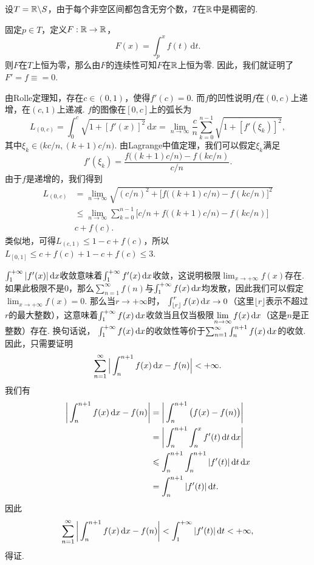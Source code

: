 \begin{ans}
  设$T=\mathbb R\backslash S$，由于每个非空区间都包含无穷个数，$T$在$\mathbb R$中是稠密的.

  固定$p\in T$，定义$F:\mathbb R\to\mathbb R$，
  \[ F(x) = \int_p^xf(t)\,\mathrm dt. \]
  则$F$在$T$上恒为零，那么由$F$的连续性可知$F$在$\mathbb R$上恒为零. 因此，我们就证明了$F'=f\equiv=0$.
\end{ans}

\begin{ans}
  由Rolle定理知，存在$c\in(0,1)$，使得$f'(c)=0$. 而$f$的凹性说明$f$在$(0,c)$上递增，在$(c,1)$上递减. $f$的图像在$[0,c]$上的弧长为
  \[
    L_{(0,c)} = \int_0^c\sqrt{1+[f'(x)]^2}\,\mathrm dx
    =\lim_{n\to\infty}\frac cn\sum_{k=0}^{n-1}
    \sqrt{1+[f'(\xi_k)]^2},
  \]
  其中$\xi_k\in \big(kc/n,(k+1)c/n\big)$. 由Lagrange中值定理，我们可以假定$\xi_k$满足
  \[ f'(\xi_k)=\frac{f\big((k+1)c/n\big)-f(kc/n)}{c/n}. \]
  由于$f$是递增的，我们得到
  \begin{align*}
    L_{(0,c)} & = \lim_{n\to\infty}\sqrt{
    (c/n)^2+\big[f\big( (k+1)c/n \big)-f(kc/n) \big]^2
    }\\
    & \le \lim_{n\to\infty}\sum_{k=0}^{n-1}
    \big[ c/n + f\big( (k+1)c/n \big)-f(kc/n) \big]\\
    & c + f(c).
  \end{align*}
  类似地，可得$L_{(c,1)}\le 1-c+f(c)$，所以$L_{[0,1]}\le c+f(c)
  +1-c+f(c)\le3$.
\end{ans}

\begin{ans}
  $\int_1^{+\infty}|f'(x)|\,\mathrm dx$收敛意味着$\int_1^{+\infty}f'(x)\,\mathrm dx$收敛，这说明极限$\lim_{x\to+\infty}f(x)$存在. 如果此极限不是0，那么$\sum_{n=1}^\infty f(n)$与$\int_1^{+\infty}f(x)\,\mathrm dx$均发散，因此我们可以假定$\lim_{x\to+\infty}f(x)=0$. 那么当$r\to+\infty$时， $\int_{\lfloor r\rfloor}^rf(x)\,\mathrm dx\to0$（这里$\lfloor r\rfloor$表示不超过$r$的最大整数），这意味着$\int_1^{+\infty}f(x)\,\mathrm dx$收敛当且仅当极限$\lim_{n\to\infty}f(x)\,\dx$（这是$n$是正整数）存在. 换句话说， $\int_1^{+\infty}f(x)\,\mathrm dx$的收敛性等价于$\sum_{n=1}^\infty \int_n^{n+1}f(x)\,\mathrm dx$的收敛. 因此，只需要证明
  \[ \sum_{n=1}^\infty\Big|\int_n^{n+1}f(x)\,\mathrm dx -f(n) \Big|
  <+\infty. \]
  我们有
  \begin{align*}
    \bigg|\int_n^{n+1}f(x)\,\mathrm dx -f(n) \bigg|
    & = \bigg| \int_n^{n+1}\big( f(x)-f(n) \big) \bigg| \\
    & = \bigg| \int_n^{n+1}\int_n^xf'(t)\,\mathrm dt\,\mathrm dx \bigg|\\
    & \leqslant \int_n^{n+1}\int_n^{n+1}|f'(t)|\,\mathrm dt\,\mathrm dx\\
    & = \int_n^{n+1}|f'(t)|\,\mathrm dt.
  \end{align*}
  因此
  \[ \sum_{n=1}^\infty\bigg|\int_n^{n+1}f(x)\,\mathrm dx -f(n) \bigg|
  < \int_1^{+\infty}|f'(t)|\,\mathrm dt <+\infty, \]
  得证.
\end{ans}

